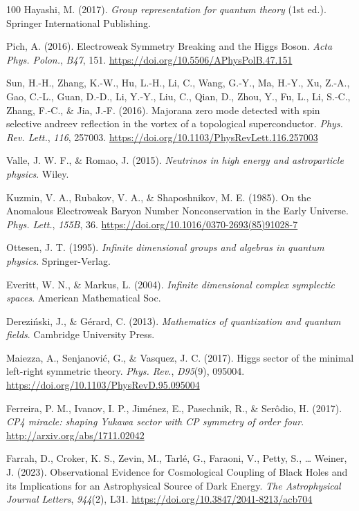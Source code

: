 \documentclass[11pt]{book}
\begin{document}
\begin{thebibliography}{100}
 Hayashi, M. (2017). \emph{Group representation for quantum theory} (1st
ed.). Springer International Publishing.

 Pich, A. (2016). Electroweak Symmetry Breaking and the Higgs Boson.
\emph{Acta Phys. Polon.}, \emph{B47}, 151.
\url{https://doi.org/10.5506/APhysPolB.47.151}

 Sun, H.-H., Zhang, K.-W., Hu, L.-H., Li, C., Wang, G.-Y., Ma, H.-Y., Xu,
Z.-A., Gao, C.-L., Guan, D.-D., Li, Y.-Y., Liu, C., Qian, D., Zhou, Y.,
Fu, L., Li, S.-C., Zhang, F.-C., \& Jia, J.-F. (2016). Majorana zero
mode detected with spin selective andreev reflection in the vortex of a
topological superconductor. \emph{Phys. Rev. Lett.}, \emph{116}, 257003.
\url{https://doi.org/10.1103/PhysRevLett.116.257003}

 Valle, J. W. F., \& Romao, J. (2015). \emph{Neutrinos in high energy and
astroparticle physics}. Wiley.

 Kuzmin, V. A., Rubakov, V. A., \& Shaposhnikov, M. E. (1985). On the
Anomalous Electroweak Baryon Number Nonconservation in the Early
Universe. \emph{Phys. Lett.}, \emph{155B}, 36.
\url{https://doi.org/10.1016/0370-2693(85)91028-7}

 Ottesen, J. T. (1995). \emph{Infinite dimensional groups and algebras in
quantum physics}. Springer-Verlag.

 Everitt, W. N., \& Markus, L. (2004). \emph{Infinite dimensional complex
symplectic spaces}. American Mathematical Soc.

 Dereziński, J., \& Gérard, C. (2013). \emph{Mathematics of quantization
and quantum fields}. Cambridge University Press.

 Maiezza, A., Senjanović, G., \& Vasquez, J. C. (2017). Higgs sector of
the minimal left-right symmetric theory. \emph{Phys. Rev.},
\emph{D95}(9), 095004. \url{https://doi.org/10.1103/PhysRevD.95.095004}

 Ferreira, P. M., Ivanov, I. P., Jiménez, E., Pasechnik, R., \& Serôdio,
H. (2017). \emph{CP4 miracle: shaping Yukawa sector with CP symmetry of
order four}. \url{http://arxiv.org/abs/1711.02042}

 Farrah, D., Croker, K. S., Zevin, M., Tarlé, G., Faraoni, V., Petty, S.,
\ldots{} Weiner, J. (2023). Observational Evidence for Cosmological
Coupling of Black Holes and its Implications for an Astrophysical Source
of Dark Energy. \emph{The Astrophysical Journal Letters}, \emph{944}(2),
L31. \url{https://doi.org/10.3847/2041-8213/acb704}


\end{thebibliography}
\end{document}
